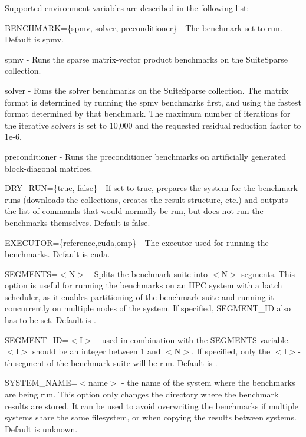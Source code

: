 Supported environment variables are described in the following list\+:


\begin{DoxyItemize}
\item {\ttfamily B\+E\+N\+C\+H\+M\+A\+RK=\{spmv, solver, preconditioner\}} -\/ The benchmark set to run. Default is {\ttfamily spmv}.
\begin{DoxyItemize}
\item {\ttfamily spmv} -\/ Runs the sparse matrix-\/vector product benchmarks on the Suite\+Sparse collection.
\item {\ttfamily solver} -\/ Runs the solver benchmarks on the Suite\+Sparse collection. The matrix format is determined by running the {\ttfamily spmv} benchmarks first, and using the fastest format determined by that benchmark. The maximum number of iterations for the iterative solvers is set to 10,000 and the requested residual reduction factor to 1e-\/6.
\item {\ttfamily preconditioner} -\/ Runs the preconditioner benchmarks on artificially generated block-\/diagonal matrices.
\end{DoxyItemize}
\item {\ttfamily D\+R\+Y\+\_\+\+R\+UN=\{true, false\}} -\/ If set to {\ttfamily true}, prepares the system for the benchmark runs (downloads the collections, creates the result structure, etc.) and outputs the list of commands that would normally be run, but does not run the benchmarks themselves. Default is {\ttfamily false}.
\item {\ttfamily E\+X\+E\+C\+U\+T\+OR=\{reference,cuda,omp\}} -\/ The executor used for running the benchmarks. Default is {\ttfamily cuda}.
\item {\ttfamily S\+E\+G\+M\+E\+N\+TS=$<$N$>$} -\/ Splits the benchmark suite into {\ttfamily $<$N$>$} segments. This option is useful for running the benchmarks on an H\+PC system with a batch scheduler, as it enables partitioning of the benchmark suite and running it concurrently on multiple nodes of the system. If specified, {\ttfamily S\+E\+G\+M\+E\+N\+T\+\_\+\+ID} also has to be set. Default is {}.
\item {\ttfamily S\+E\+G\+M\+E\+N\+T\+\_\+\+ID=$<$I$>$} -\/ used in combination with the {\ttfamily S\+E\+G\+M\+E\+N\+TS} variable. {\ttfamily $<$I$>$} should be an integer between 1 and {\ttfamily $<$N$>$}. If specified, only the {\ttfamily $<$I$>$}-\/th segment of the benchmark suite will be run. Default is {}.
\item {\ttfamily S\+Y\+S\+T\+E\+M\+\_\+\+N\+A\+ME=$<$name$>$} -\/ the name of the system where the benchmarks are being run. This option only changes the directory where the benchmark results are stored. It can be used to avoid overwriting the benchmarks if multiple systems share the same filesystem, or when copying the results between systems. Default is {\ttfamily unknown}.
\end{DoxyItemize}

